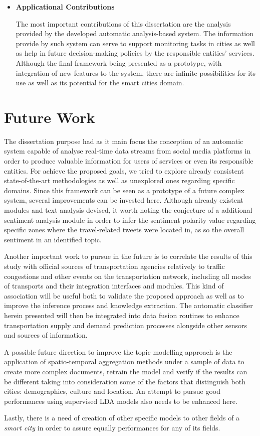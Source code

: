 \begin{itemize}
	\item \textbf{Applicational Contributions}
	
	The most important contributions of this dissertation are the analysis provided by the developed automatic analysis-based system. The information provide by such system can serve to support monitoring tasks in cities as well as help in future decision-making policies by the responsible entities' services. Although the final framework being presented as a prototype, with integration of new features to the system, there are infinite possibilities for its use as well as its potential for the smart cities domain.
\end{itemize}

\section{Future Work}

The dissertation purpose had as it main focus the conception of an automatic system capable of analyse real-time data streams from social media platforms in order to produce valuable information for users of services or even its responsible entities. For achieve the proposed goals, we tried to explore already consistent state-of-the-art methodologies as well as unexplored ones regarding specific domains. Since this framework can be seen as a prototype of a future complex system, several improvements can be invested here. Although already existent modules and text analysis devised, it worth noting the conjecture of a additional sentiment analysis module in order to infer the sentiment polarity value regarding specific zones where the travel-related tweets were located in, as so the overall sentiment in an identified topic.

Another important work to pursue in the future is to correlate the results of this study with official sources of transportation agencies relatively to traffic congestions and other events on the transportation network, including all modes of transports and their integration interfaces and modules. This kind of association will be useful both to validate the proposed approach as well as to improve the inference process and knowledge extraction. The automatic classifier herein presented will then be integrated into data fusion routines to enhance transportation supply and demand prediction processes alongside other sensors and sources of information.

A possible future direction to improve the topic modelling approach is the application of spatio-temporal aggregation methods under a sample of data to create more complex documents, retrain the model and verify if the results can be different taking into consideration some of the factors that distinguish both cities: demographics, culture and location. An attempt to pursue good performances using supervised LDA models also needs to be enhanced here.

Lastly, there is a need of creation of other specific models to other fields of a \textit{smart city} in order to assure equally performances for any of its fields.